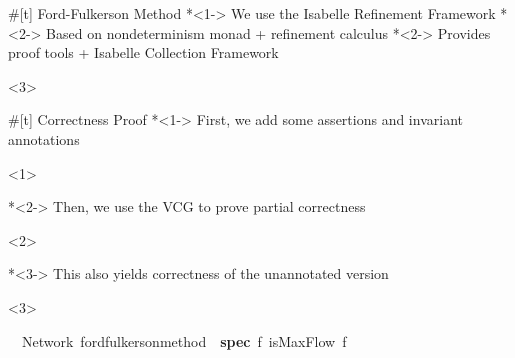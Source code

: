 \documentclass[fleqn]{beamer}
\def\isachardoublequoteopen{}%
\def\isachardoublequoteclose{}%
\newcommand{\isainnerkeyword}[1]{{\textbf{#1}}}
\begin{document}
{\def\snippetnprf{
\isacommand{theorem}\isamarkupfalse%
\ {\isacharparenleft}\isakeyword{in}\ Network{\isacharparenright}\ {\isachardoublequoteopen}ford{\isacharunderscore}fulkerson{\isacharunderscore}method\ {\isasymle}\ {\isacharparenleft}\isainnerkeyword{spec}\ f{\isachardot}\ isMaxFlow\ f{\isacharparenright}{\isachardoublequoteclose}%
}

#[t] Ford-Fulkerson Method
  {}
  *<1-> We use the Isabelle Refinement Framework
    *<2-> Based on nondeterminism monad + refinement calculus 
    *<2-> Provides proof tools + Isabelle Collection Framework
      \vspace*{1em}
      
      \begin{onlyenv}<3>
        \isasnip\snippetfofu
      \end{onlyenv}

#[t] Correctness Proof  
  *<1-> First, we add some assertions and invariant annotations
    \begin{onlyenv}<1>
      \vspace*{1em}
      
      \isasnipsmall\snippetfofuassn
    \end{onlyenv}
  *<2-> Then, we use the VCG to prove partial correctness
    \begin{onlyenv}<2>
      \vspace*{1em}
      
      \isasnip\snippetproof
    \end{onlyenv}
  *<3-> This also yields correctness of the unannotated version
    \begin{onlyenv}<3>
      \vspace*{1em}
      
      \isasnip\snippetnprf
    \end{onlyenv}
  
}
\end{document}
